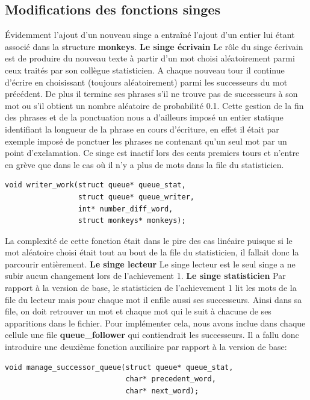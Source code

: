 \documentclass[12pt]{article}
\begin{document}
\subsection{Modifications des fonctions singes}
Évidemment l'ajout d'un nouveau singe a entraîné l'ajout d'un entier lui étant associé dans la structure \textbf{monkeys}.
\bigbreak
\textbf{Le singe écrivain}
\bigbreak
Le rôle du singe écrivain est de produire du nouveau texte à partir d'un mot choisi aléatoirement parmi ceux traités par son collègue statisticien. A chaque nouveau tour il continue d'écrire en choisissant (toujours aléatoirement) parmi les successeurs du mot précédent. De plus il termine ses phrases s'il ne trouve pas de successeurs à son mot ou s'il obtient un nombre aléatoire de probabilité 0.1. Cette gestion de la fin des phrases et de la ponctuation nous a d'ailleurs imposé un entier statique identifiant la longueur de la phrase en cours d'écriture, en effet il était par exemple imposé de ponctuer les phrases ne contenant qu'un seul mot par un point d'exclamation.
Ce singe est inactif lors des cents premiers tours et n'entre en grève que dans le cas où il n'y a plus de mots dans la file du statisticien.
\bigbreak
\begin{lstlisting}
void writer_work(struct queue* queue_stat,
                 struct queue* queue_writer, 
                 int* number_diff_word, 
                 struct monkeys* monkeys);
\end{lstlisting}
\bigbreak
La complexité de cette fonction était dans le pire des cas linéaire puisque si le mot aléatoire choisi était tout au bout de la file du statisticien, il fallait donc la parcourir entièrement.
\bigbreak
\textbf{Le singe lecteur}
\bigbreak
Le singe lecteur est le seul singe a ne subir aucun changement lors de l'achievement 1.
\bigbreak
\textbf{Le singe statisticien}
\bigbreak
Par rapport à la version de base, le statisticien de l'achievement 1 lit les mots de la file du lecteur mais pour chaque mot il enfile aussi ses successeurs. Ainsi dans sa file, on doit retrouver un mot et chaque mot qui le suit à chacune de ses apparitions dans le fichier. Pour implémenter cela, nous avons inclue dans chaque cellule une file \textbf{queue\_follower} qui contiendrait les successeurs. Il a fallu donc introduire une deuxième fonction auxiliaire par rapport à la version de base:
\bigbreak
\begin{lstlisting}
void manage_successor_queue(struct queue* queue_stat, 
                            char* precedent_word, 
                            char* next_word);
\end{lstlisting}
\end{document}
